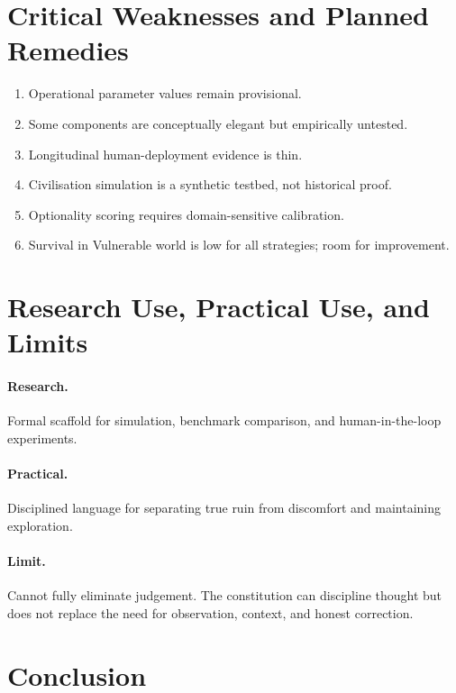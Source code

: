 \section{Critical Weaknesses and Planned Remedies}
\label{sec:omega-weaknesses}

\begin{enumerate}
\item Operational parameter values remain provisional.
\item Some components are conceptually elegant but empirically
untested.
\item Longitudinal human-deployment evidence is thin.
\item Civilisation simulation is a synthetic testbed, not historical
proof.
\item Optionality scoring requires domain-sensitive calibration.
\item Survival in Vulnerable world is low for all strategies; room
for improvement.
\end{enumerate}

\section{Research Use, Practical Use, and Limits}
\label{sec:omega-use-and-limits}

\paragraph{Research.}
Formal scaffold for simulation, benchmark comparison, and
human-in-the-loop experiments.

\paragraph{Practical.}
Disciplined language for separating true ruin from discomfort and
maintaining exploration.

\paragraph{Limit.}
Cannot fully eliminate judgement. The constitution can discipline
thought but does not replace the need for observation, context, and
honest correction.

\section{Conclusion}
\label{sec:omega-conclusion}

